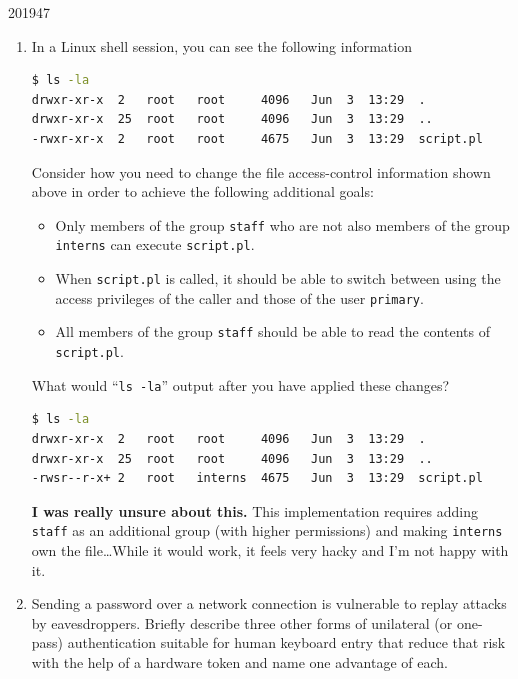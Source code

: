 \documentclass[10pt,\jkfside,a4paper]{article}
\begin{document}
\begin{examquestion}{2019}{4}{7}

\begin{enumerate}[label=(\alph*)]

\item In a Linux shell session, you can see the following information
\begin{lstlisting}[language=Bash]
$ ls -la
drwxr-xr-x  2   root   root     4096   Jun  3  13:29  .
drwxr-xr-x  25  root   root     4096   Jun  3  13:29  ..
-rwxr-xr-x  2   root   root     4675   Jun  3  13:29  script.pl
\end{lstlisting}
Consider how you need to change the file access-control information shown 
above in order to achieve the following additional goals:
\begin{itemize}

\item Only members of the group \texttt{staff} who are not also members of 
the group \texttt{interns} can execute \texttt{script.pl}.

\item When \texttt{script.pl} is called, it should be able to switch between
using the access privileges of the caller and those of the user 
\texttt{primary}.

\item All members of the group \texttt{staff} should be able to read the
contents of \texttt{script.pl}.

\end{itemize}

What would ``\texttt{ls -la}'' output after you have applied these changes?

\begin{lstlisting}[language=Bash]
$ ls -la
drwxr-xr-x  2   root   root     4096   Jun  3  13:29  .
drwxr-xr-x  25  root   root     4096   Jun  3  13:29  ..
-rwsr--r-x+ 2   root   interns  4675   Jun  3  13:29  script.pl
\end{lstlisting}

\textbf{I was really unsure about this.} This implementation requires adding
\texttt{staff} as an additional group (with higher permissions) and making
\texttt{interns} own the file\dots While it would work, it feels very hacky and
I'm not happy with it.

\item Sending a password over a network connection is vulnerable to replay 
attacks by eavesdroppers. Briefly describe three other forms of unilateral 
(or one-pass) authentication suitable for human keyboard entry that reduce 
that risk with the help of a hardware token and name one advantage of each.


\end{enumerate}
\end{examquestion}
\end{document}
